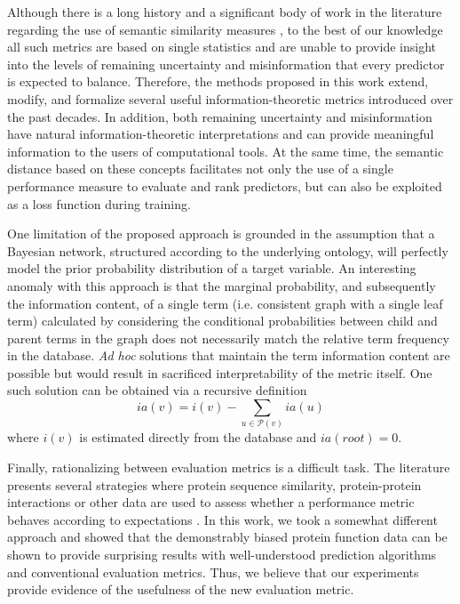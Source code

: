 Although there is a long history \citep{Resnik1999} and a significant body of work in the literature regarding the use of semantic similarity measures \citep{Pesquita2009,Guzzi2012}, to the best of our knowledge all such metrics are based on single statistics and are unable to provide insight into the levels of remaining uncertainty and misinformation that every predictor is expected to balance. Therefore, the methods proposed in this work extend, modify, and formalize several useful information-theoretic metrics introduced over the past decades. In addition, both remaining uncertainty and misinformation have natural information-theoretic interpretations and can provide meaningful information to the users of computational tools. At the same time, the semantic distance based on these concepts facilitates not only the use of a single performance measure to evaluate and rank predictors, but can also be exploited as a loss function during training.

One limitation of the proposed approach is grounded in the assumption that a Bayesian network, structured according to the underlying ontology, will perfectly model the prior probability distribution of a target variable. An interesting anomaly with this approach is that the marginal probability, and subsequently the information content, of a single term (i.e. consistent graph with a single leaf term) calculated by considering the conditional probabilities between child and parent terms in the graph does not necessarily match the relative term frequency in the database. \emph{Ad hoc} solutions that maintain the term information content are possible but would result in sacrificed interpretability of the metric itself. One such solution can be obtained via a recursive definition 
\[
ia(v)=i(v)-\sum_{u\in\mathcal{P}(v)}ia(u) 
\]
where $i(v)$ is estimated directly from the database and $ia(root)=0$.

Finally, rationalizing between evaluation metrics is a difficult task. The literature presents several strategies where protein sequence similarity, protein-protein interactions or other data are used to assess whether a performance metric behaves according to expectations \citep{Guzzi2012}. In this work, we took a somewhat different approach and showed that the demonstrably biased protein function data can be shown to provide surprising results with well-understood prediction algorithms and conventional evaluation metrics. Thus, we believe that our experiments provide evidence of the usefulness of the new evaluation metric.



